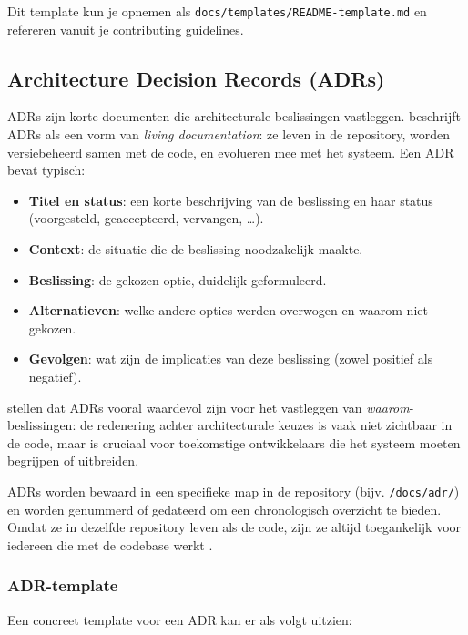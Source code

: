 Dit template kun je opnemen als \texttt{docs/templates/README-template.md} en refereren vanuit je contributing guidelines.

\subsection{Architecture Decision Records (ADRs)}
ADRs zijn korte documenten die architecturale beslissingen vastleggen. \textcite{martraire2019livingdocumentation} beschrijft ADRs als een vorm van \textit{living documentation}: ze leven in de repository, worden versiebeheerd samen met de code, en evolueren mee met het systeem. Een ADR bevat typisch:

\begin{itemize}
    \item \textbf{Titel en status}: een korte beschrijving van de beslissing en haar status (voorgesteld, geaccepteerd, vervangen, \ldots).
    \item \textbf{Context}: de situatie die de beslissing noodzakelijk maakte.
    \item \textbf{Beslissing}: de gekozen optie, duidelijk geformuleerd.
    \item \textbf{Alternatieven}: welke andere opties werden overwogen en waarom niet gekozen.
    \item \textbf{Gevolgen}: wat zijn de implicaties van deze beslissing (zowel positief als negatief).
\end{itemize}

\textcite{bhatti2021docsdevelopers} stellen dat ADRs vooral waardevol zijn voor het vastleggen van \textit{waarom}-beslissingen: de redenering achter architecturale keuzes is vaak niet zichtbaar in de code, maar is cruciaal voor toekomstige ontwikkelaars die het systeem moeten begrijpen of uitbreiden.

ADRs worden bewaard in een specifieke map in de repository (bijv. \texttt{/docs/adr/}) en worden genummerd of gedateerd om een chronologisch overzicht te bieden. Omdat ze in dezelfde repository leven als de code, zijn ze altijd toegankelijk voor iedereen die met de codebase werkt \autocite{gentle2017docslikecode}.

\subsubsection{ADR-template}
Een concreet template voor een ADR kan er als volgt uitzien:


